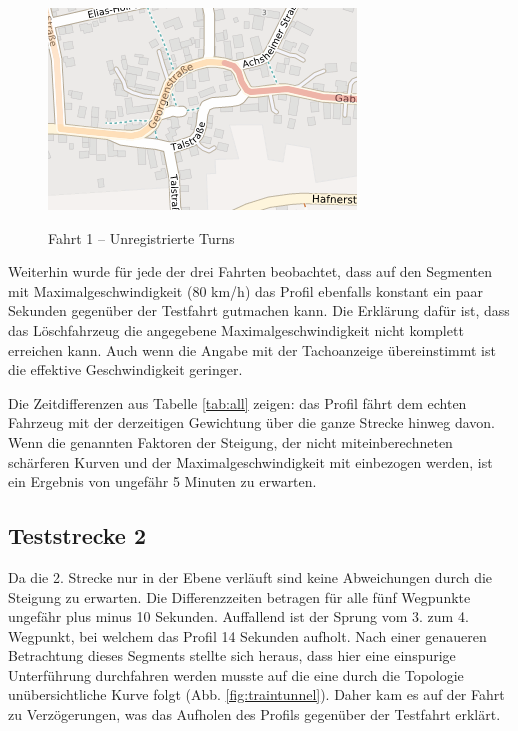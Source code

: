 \begin{figure}[htb]
\centering
\caption{Fahrt 1 -- Unregistrierte Turns}
\label{fig:curve}
\includegraphics[width = 0.50 \textwidth]{../media/Fahrt1_curve.png} \\
\end{figure}


Weiterhin wurde für jede der drei Fahrten beobachtet, dass auf den Segmenten mit Maximalgeschwindigkeit (80 km/h) das Profil ebenfalls konstant ein paar Sekunden gegenüber der Testfahrt gutmachen kann.
Die Erklärung dafür ist, dass das Löschfahrzeug die angegebene Maximalgeschwindigkeit nicht komplett erreichen kann.
Auch wenn die Angabe mit der Tachoanzeige übereinstimmt ist die effektive Geschwindigkeit geringer.

Die Zeitdifferenzen aus Tabelle \ref{tab:all} zeigen: das Profil fährt dem echten Fahrzeug mit der derzeitigen Gewichtung über die ganze Strecke hinweg davon.
Wenn die genannten Faktoren der Steigung, der nicht miteinberechneten schärferen Kurven und der Maximalgeschwindigkeit mit einbezogen werden, ist ein Ergebnis von ungefähr 5 Minuten zu erwarten.


\subsection{Teststrecke 2}

Da die 2. Strecke nur in der Ebene verläuft sind keine Abweichungen durch die Steigung zu erwarten.
Die Differenzzeiten betragen für alle fünf Wegpunkte ungefähr plus minus 10 Sekunden.
Auffallend ist der Sprung vom 3. zum 4. Wegpunkt, bei welchem das Profil 14 Sekunden aufholt.
Nach einer genaueren Betrachtung dieses Segments stellte sich heraus, dass hier eine einspurige Unterführung durchfahren werden musste auf die eine durch die Topologie unübersichtliche Kurve folgt (Abb. \ref{fig:traintunnel}).
Daher kam es auf der Fahrt zu Verzögerungen, was das Aufholen des Profils gegenüber der Testfahrt erklärt.

